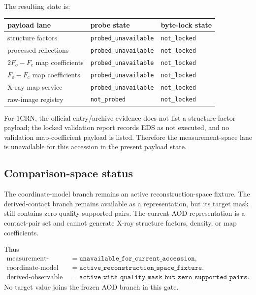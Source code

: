 The resulting state is:
\begin{center}
\begin{tabular}{@{}lll@{}}
\toprule
payload lane & probe state & byte-lock state \\
\midrule
structure factors & \texttt{probed\_unavailable} & \texttt{not\_locked} \\
processed reflections & \texttt{probed\_unavailable} & \texttt{not\_locked} \\
$2F_o-F_c$ map coefficients & \texttt{probed\_unavailable} & \texttt{not\_locked} \\
$F_o-F_c$ map coefficients & \texttt{probed\_unavailable} & \texttt{not\_locked} \\
X-ray map service & \texttt{probed\_unavailable} & \texttt{not\_locked} \\
raw-image registry & \texttt{not\_probed} & \texttt{not\_locked} \\
\bottomrule
\end{tabular}
\end{center}

For 1CRN, the official entry/archive evidence does not list a structure-factor payload; the locked validation report records EDS as not executed, and no validation map-coefficient payload is listed. Therefore the measurement-space lane is unavailable for this accession in the present payload state.

\subsection{Comparison-space status}

The coordinate-model branch remains an active reconstruction-space fixture. The derived-contact branch remains available as a representation, but its target mask still contains zero quality-supported pairs. The current AOD representation is a contact-pair set and cannot generate X-ray structure factors, density, or map coefficients.

Thus
\[
\begin{aligned}
\text{measurement-space lane} &= \texttt{unavailable\_for\_current\_accession},\\
\text{coordinate-model lane} &= \texttt{active\_reconstruction\_space\_fixture},\\
\text{derived-observable lane} &= \texttt{active\_with\_quality\_mask\_but\_zero\_supported\_pairs}.
\end{aligned}
\]
No target value joins the frozen AOD branch in this gate.

